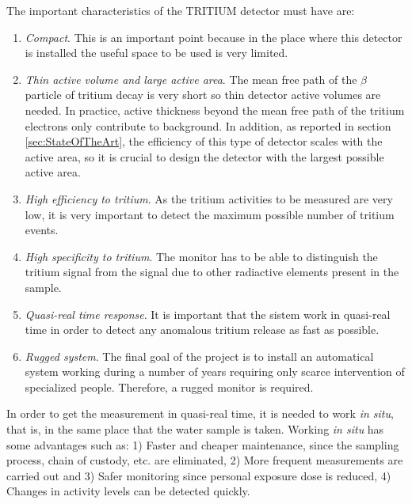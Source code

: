 The important characteristics of the TRITIUM detector must have are:

\begin{enumerate}

\item{} \textit{Compact}. This is an important point because in the place where this detector is installed the useful space to be used is very limited.

\item{} \textit{Thin active volume and large active area}. The mean free path of the $\beta$ particle of tritium decay is very short so thin detector active volumes are needed. In practice, active thickness beyond the mean free path of the tritium electrons only contribute to background. In addition, as reported in section \ref{sec:StateOfTheArt}, the efficiency of this type of detector scales with the active area, so it is crucial to design the detector with the largest possible active area.

\item{} \textit{High efficiency to tritium}. As the tritium activities to be measured are very low, it is very important to detect the maximum possible number of tritium events.

\item{} \textit{High specificity to tritium}. The monitor has to be able to distinguish the tritium signal from the signal due to other radiactive elements present in the sample.

\item{} \textit{Quasi-real time response}. It is important that the sistem work in quasi-real time in order to detect any anomalous tritium release as fast as possible. 

\item{} \textit{Rugged system}. The final goal of the project is to install an automatical system working during a number of years requiring only scarce intervention of specialized people. Therefore, a rugged monitor is required.

\end{enumerate}

In order to get the measurement in quasi-real time, it is needed to work \textit{in situ}, that is, in the same place that the water sample is taken. Working \textit{in situ} has some advantages such as: 1) Faster and cheaper maintenance, since the sampling process, chain of custody, etc. are eliminated, 2) More frequent measurements are carried out and 3) Safer monitoring since personal exposure dose is reduced, 4) Changes in activity levels can be detected quickly.


